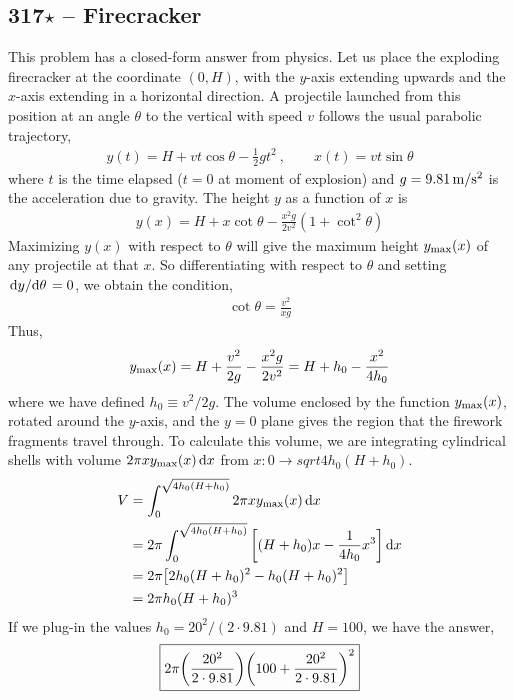 \documentclass{article}
\begin{document}
\subsection*{317$\star$ -- Firecracker}
This problem has a closed-form answer from physics.
Let us place the exploding firecracker at the coordinate $(0, H)$, with the $y$-axis extending upwards and the $x$-axis extending in a horizontal direction.
A projectile launched from this position at an angle $\theta$ to the vertical with speed $v$ follows the usual parabolic trajectory,
\begin{align*}
	y(t) = H + v t \cos \theta - \frac{1}{2} gt^2 ~, \qquad x(t) = v t \sin\theta
\end{align*}
where $t$ is the time elapsed ($t=0$ at moment of explosion) and $g = 9.81 \, {\rm m/s^2}$ is the acceleration due to gravity.
The height $y$ as a function of $x$ is
\begin{align*}
	y(x) = H + x \cot \theta - \frac{x^2 g}{2 v^2}(1 + \cot^2\theta)
\end{align*}
Maximizing $y(x)$ with respect to $\theta$ will give the maximum height $y_{\rm max}(x)$ of any projectile at that $x$.
So differentiating with respect to $\theta$ and setting $\dv*{y}{\theta} = 0$, we obtain the condition,
\begin{align*}
	\cot\theta = \frac{v^2}{xg}
\end{align*}
Thus,
\begin{align*}
	y_{\rm max}(x) = H + \frac{v^2}{2g} - \frac{x^2 g}{2 v^2} = H + h_0 - \frac{x^2}{4 h_0}
\end{align*}
where we have defined $h_0 \equiv v^2 / 2g$.
The volume enclosed by the function $y_{\rm max}(x)$, rotated around the $y$-axis, and the $y=0$ plane gives the region that the firework fragments travel through.
To calculate this volume, we are integrating cylindrical shells with volume $2\pi x y_{\rm max}(x) \dd{x}$ from $x:0 \to sqrt{4h_0(H + h_0)}$.
\begin{align*}
	V &= \int_0^{\sqrt{4h_0(H + h_0)}}  2\pi x y_{\rm max}(x) \dd{x} \\
	&= 2\pi \int_0^{\sqrt{4h_0(H + h_0)}} \qty[ (H + h_0)x - \frac{1}{4h_0} x^3 ] \dd{x} \\
	&= 2\pi \qty[2h_0(H + h_0)^2 - h_0 (H + h_0)^2 ] \\
	&= 2 \pi h_0 (H + h_0)^3
\end{align*}
If we plug-in the values $h_0 = 20^2/(2 \cdot 9.81)$ and $H = 100$, we have the answer,
\begin{align*}
	\boxed{ 2 \pi \qty(\frac{20^2}{2 \cdot 9.81}) \qty(100 + \frac{20^2}{2 \cdot 9.81})^2 }
\end{align*}
\end{document}
